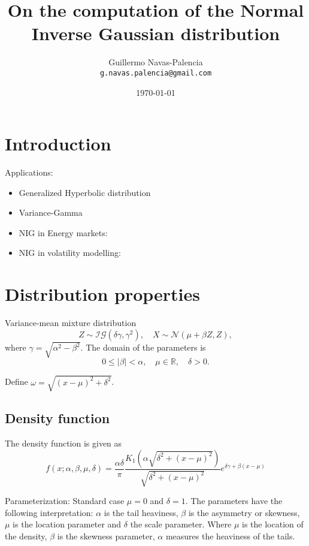 \documentclass[10pt,a4paper,oneside]{article}
\title{On the computation of the Normal Inverse Gaussian distribution}
\author{
 \normalsize  Guillermo Navas-Palencia\\
  \texttt{\normalsize  g.navas.palencia@gmail.com}
}
\date{\small \today}
\numberwithin{equation}{section}
\begin{document}
\maketitle

\section{Introduction}

Applications:
\begin{itemize}
\item Generalized Hyperbolic distribution \cite{Prause1999}
\item Variance-Gamma \cite{Madan1990}
\item NIG in Energy markets: \cite{Benth2004}
\item NIG in volatility modelling: \cite{Barndorff1997}
\end{itemize}

\section{Distribution properties}

Variance-mean mixture distribution
\begin{equation}
Z \sim \mathcal{IG}(\delta \gamma, \gamma^2), \quad X \sim \mathcal{N}(\mu + \beta Z, Z),
\end{equation}
where $\gamma = \sqrt{\alpha^2 - \beta^2}$. The domain of the parameters is
\begin{equation}
0 \le |\beta| < \alpha, \quad \mu \in \mathbb{R}, \quad \delta  > 0.
\end{equation}

Define $\omega = \sqrt{(x-\mu)^2 + \delta^2}$.

\subsection{Density function}
The density function is given as
\begin{equation}
f(x; \alpha, \beta, \mu, \delta) = \frac{\alpha \delta}{\pi} \frac{K_1\left(\alpha\sqrt{\delta^2 + (x-\mu)^2}\right)}{\sqrt{\delta^2 + (x-\mu)^2}} e^{\delta \gamma + \beta(x-\mu)}
\end{equation}

Parameterization: Standard case $\mu = 0$ and $\delta = 1$. The parameters have the following interpretation: $\alpha$ is the tail heaviness, $\beta$ is the asymmetry or skewness, $\mu$ is the location parameter and $\delta$ the scale parameter. Where $\mu$ is the location of the density, $\beta$ is the skewness parameter, $\alpha$ measures the heaviness of the tails.
\end{document}
